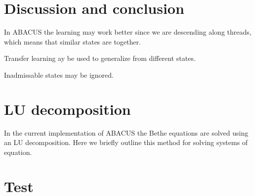 \documentclass[11pt, a4paper,draft]{report} %
\begin{document}
\chapter{Discussion and conclusion}


In ABACUS the learning may work better since we are descending along threads, which means that similar states are together.

Transfer learning ay be used to generalize from different states.

Inadmissable states may be ignored.

\appendix
\chapter{LU decomposition}\label{app:LUdecomp}
In the current implementation of ABACUS the Bethe equations are solved using an LU decomposition. 
Here we briefly outline this method for solving systems of equation.

\chapter{Test}	



\end{document}
